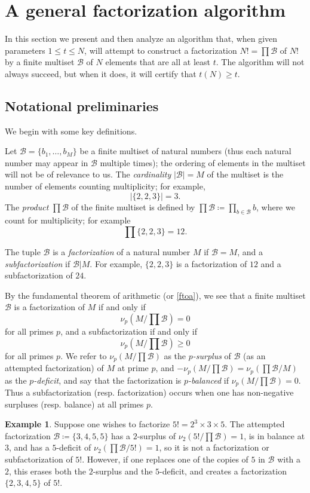 \documentclass[12pt,a4paper,reqno]{amsart}
\numberwithin{equation}{section}
\theoremstyle{plain}
\theoremstyle{definition}
\newtheorem{example}[theorem]{Example}
\newcommand\tuple{{\mathcal B}}
\begin{document}
\section{A general factorization algorithm}

In this section we present and then analyze an algorithm that, when given parameters $1 \leq t \leq N$, will attempt to construct a factorization $N! = \prod \tuple$ of $N!$ by a finite multiset $\tuple$ of $N$ elements that are all at least $t$.  The algorithm will not always succeed, but when it does, it will certify that $t(N) \geq t$.

\subsection{Notational preliminaries}

We begin with some key definitions.

Let $\tuple = \{ b_1,\dots,b_M\}$ be a finite multiset of natural numbers (thus each natural number may appear in $\tuple$ multiple times); the ordering of elements in the multiset will not be of relevance to us.  The \emph{cardinality} $|\tuple| = M$ of the multiset is the number of elements counting multiplicity; for example,
$$ |\{ 2,2,3\}| = 3.$$
The \emph{product} $\prod \tuple$ of the finite multiset is defined by $\prod \tuple \coloneqq \prod_{b \in \tuple} b$, where we count for multiplicity; for example
$$ \prod \{2,2,3\} = 12.$$

The tuple $\tuple$ is a \emph{factorization} of a natural number $M$ if $\tuple = M$, and a \emph{subfactorization} if $\tuple | M$.  For example, $\{2,2,3\}$ is a factorization of $12$ and a subfactorization of $24$.


By the fundamental theorem of arithmetic (or \eqref{ftoa}), we see that a finite multiset $\tuple$ is a factorization of $M$ if and only if
$$ \nu_p( M / \prod \tuple ) = 0$$
for all primes $p$, and a subfactorization if and only if
$$ \nu_p( M / \prod \tuple ) \geq 0$$
for all primes $p$.  We refer to $\nu_p( M / \prod \tuple )$ as the \emph{$p$-surplus} of $\tuple$ (as an attempted factorization) of $M$ at prime $p$, and $-\nu_p(M/\prod\tuple) = \nu_p(\prod\tuple/M)$ as the \emph{$p$-deficit}, and say that the factorization is \emph{$p$-balanced} if $\nu_p(M/\prod \tuple)=0$.  Thus a subfactorization (resp. factorization) occurs when one has non-negative surpluses (resp. balance) at all primes $p$.

\begin{example} Suppose one wishes to factorize $5! = 2^3 \times 3 \times 5$.  The attempted factorization ${\mathcal B} \coloneqq \{3,4,5,5\}$ has a $2$-surplus of $\nu_2(5!/\prod {\mathcal B}) = 1$, is in balance at $3$, and has a $5$-deficit of $\nu_2(\prod {\mathcal B}/5!) = 1$, so it is not a factorization or subfactorization of $5!$.  However, if one replaces one of the copies of $5$ in ${\mathcal B}$ with a $2$, this erases both the $2$-surplus and the $5$-deficit, and creates a factorization $\{2,3,4,5\}$ of $5!$.
\end{example}
\end{document}
